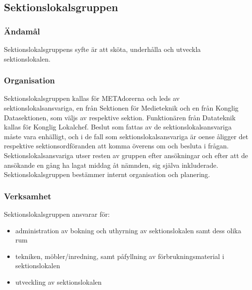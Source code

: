\documentclass{dgovdoc}
\begin{document}
\subsection{Sektionslokalsgruppen}

\subsubsection{Ändamål}

Sektionslokalsgruppens syfte är att sköta, underhålla och utveckla
sektionslokalen.

\subsubsection{Organisation}

Sektionslokalsgruppen kallas för METAdorerna och leds av sektionslokalsansvariga, en från Sektionen för
Medieteknik och en från Konglig Datasektionen, som väljs av respektive sektion.
Funktionären från Datateknik kallas för Konglig Lokalchef. Beslut som fattas av de sektionslokalsansvariga måste vara enhälligt, och i de
fall som sektionslokalsansvariga är oense åligger det respektive
sektionsordföranden att komma överens om och besluta i frågan.
Sektionslokalsansvariga utser resten av gruppen efter ansökningar och efter att
de ansökande en gång ha lagat middag åt nämnden, sig själva inkluderade.
Sektionslokalsgruppen bestämmer internt organisation och planering.

\subsubsection{Verksamhet}

Sektionslokalsgruppen ansvarar för:

\begin{itemize}
  \item administration av bokning och uthyrning av sektionslokalen samt dess
    olika rum
\end{itemize}

\begin{itemize}
  \item tekniken, möbler/inredning, samt påfyllning av förbrukningsmaterial i
    sektionslokalen
\end{itemize}

\begin{itemize}
  \item utveckling av sektionslokalen
\end{itemize}
\end{document}
